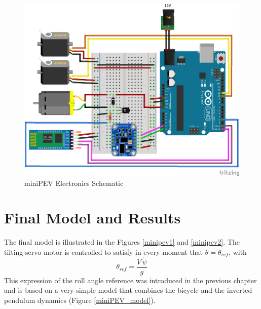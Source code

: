 \begin{itemize}
\begin{itemize}
	\begin{figure}[h!]
		\includegraphics[width=0.9\linewidth]{figs/04/miniPEV_bb}
		\caption{miniPEV Electronics Schematic}
	\end{figure}

	
\end{itemize}
\end{itemize}
\hfill

\section{Final Model and Results}

The final model is illustrated in the Figures \ref{minipev1} and \ref{minipev2}. The tilting servo motor is controlled to satisfy in every moment that $\theta=\theta_{ref}$, with \[\theta_{ref}=\frac{V\,\dot{\psi}}{g}\] This expression of the roll angle reference was introduced in the previous chapter and is based on a very simple model that combines the bicycle and the inverted pendulum dynamics (Figure \ref{miniPEV_model}).

